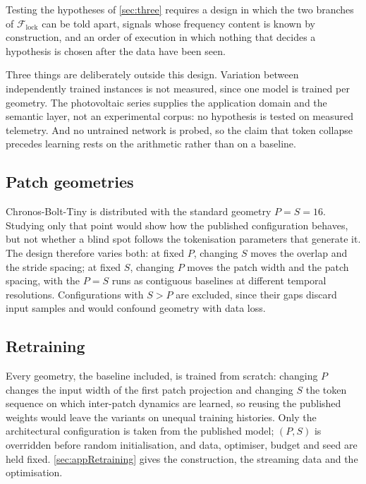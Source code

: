 Testing the hypotheses of \autoref{sec:three} requires a design in which the two branches of $\mathcal F_{\mathrm{lock}}$ can be told apart, signals whose frequency content is known by construction, and an order of execution in which nothing that decides a hypothesis is chosen after the data have been seen.

Three things are deliberately outside this design. Variation between independently trained instances is not measured, since one model is trained per geometry. The photovoltaic series supplies the application domain and the semantic layer, not an experimental corpus: no hypothesis is tested on measured telemetry. And no untrained network is probed, so the claim that token collapse precedes learning rests on the arithmetic rather than on a baseline.

\subsection{Patch geometries}

Chronos-Bolt-Tiny is distributed with the standard geometry $P=S=16$. Studying only that point would show how the published configuration behaves, but not whether a blind spot follows the tokenisation parameters that generate it. The design therefore varies both: at fixed $P$, changing $S$ moves the overlap and the stride spacing; at fixed $S$, changing $P$ moves the patch width and the patch spacing, with the $P=S$ runs as contiguous baselines at different temporal resolutions. Configurations with $S>P$ are excluded, since their gaps discard input samples and would confound geometry with data loss.

\subsection{Retraining}

Every geometry, the baseline included, is trained from scratch: changing $P$ changes the input width of the first patch projection and changing $S$ the token sequence on which inter-patch dynamics are learned, so reusing the published weights would leave the variants on unequal training histories. Only the architectural configuration is taken from the published model; $(P,S)$ is overridden before random initialisation, and data, optimiser, budget and seed are held fixed. \autoref{sec:appRetraining} gives the construction, the streaming data and the optimisation.



